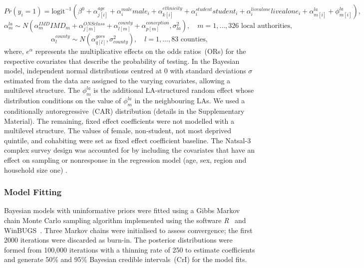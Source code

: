 \documentclass[fleqn,10pt]{wlscirep}
\begin{document}
\begin{displaymath}
Pr(y_i = 1) = \mbox{logit}^{-1} \left( \beta^0 + \alpha_{j[i]}^{age} + \alpha_i^{male} male_i + \alpha_{k[i]}^{ethnicity} + \alpha_i^{student} student_i + \alpha_i^{livealone} livealone_i + \alpha_{m[i]}^{la} + \phi_{m[i]}^{la} \right),
\end{displaymath}
\begin{displaymath}
\alpha_m^{la} \sim N \left( \alpha_m^{IMD} IMD_m + \alpha_{j[m]}^{ONSclass} + \alpha_{l[m]}^{county} + \alpha_{p[m]}^{conception}, \sigma_{la}^2 \right), \quad m = 1,\ldots, 326 \mbox{ local authorities},
\end{displaymath}
\begin{displaymath}
\alpha_l^{county} \sim N \left( \alpha_{q[l]}^{gors}, \sigma_{county}^2 \right), \quad l = 1, \ldots, 83 \mbox{ counties},
\end{displaymath}
\noindent
where, $e^{\alpha}$ represents the multiplicative effects on the odds ratios~(ORs) for the respective covariates that describe the probability of testing. In the Bayesian model, independent normal distributions centred at 0 with standard deviations $\sigma$ estimated from the data are assigned to the varying covariates, allowing a multilevel structure. The $\phi_m^{la}$ is the additional LA-structured random effect whose distribution conditions on the value of $\phi_m^{la}$ in the neighbouring LAs. We used a conditionally autoregressive~(CAR) distribution (details in the Supplementary Material). The remaining, fixed effect coefficients were not modelled with a multilevel structure. The values of female, non-student, not most deprived quintile, and cohabiting were set as fixed effect coefficient baseline.
The Natsal-3 complex survey design was accounted for by including the covariates that have an effect on sampling or nonresponse in the regression model (age, sex, region and household size one) \cite{Gelman2007b}.

\subsubsection*{Model Fitting}
Bayesian models with uninformative priors were fitted using a Gibbs Markov chain Monte Carlo sampling algorithm implemented using the software {\it R}~\cite{RCoreTeam2017} and WinBUGS~\cite{Lunn2000}. Three Markov chains were initialised to assess convergence; the first 2000 iterations were discarded as burn-in. The posterior distributions were formed from 100,000 iterations with a thinning rate of 250 to estimate coefficients and generate 50\% and 95\% Bayesian credible intervals~(CrI) for the model fits.
\end{document}
